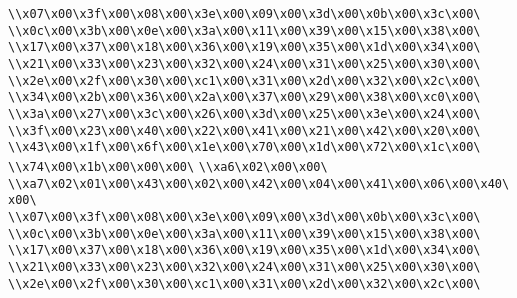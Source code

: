 \verb|\\x07\x00\x3f\x00\x08\x00\x3e\x00\x09\x00\x3d\x00\x0b\x00\x3c\x00\|\newline
\verb|\\x0c\x00\x3b\x00\x0e\x00\x3a\x00\x11\x00\x39\x00\x15\x00\x38\x00\|\newline
\verb|\\x17\x00\x37\x00\x18\x00\x36\x00\x19\x00\x35\x00\x1d\x00\x34\x00\|\newline
\verb|\\x21\x00\x33\x00\x23\x00\x32\x00\x24\x00\x31\x00\x25\x00\x30\x00\|\newline
\verb|\\x2e\x00\x2f\x00\x30\x00\xc1\x00\x31\x00\x2d\x00\x32\x00\x2c\x00\|\newline
\verb|\\x34\x00\x2b\x00\x36\x00\x2a\x00\x37\x00\x29\x00\x38\x00\xc0\x00\|\newline
\verb|\\x3a\x00\x27\x00\x3c\x00\x26\x00\x3d\x00\x25\x00\x3e\x00\x24\x00\|\newline
\verb|\\x3f\x00\x23\x00\x40\x00\x22\x00\x41\x00\x21\x00\x42\x00\x20\x00\|\newline
\verb|\\x43\x00\x1f\x00\x6f\x00\x1e\x00\x70\x00\x1d\x00\x72\x00\x1c\x00\|\newline
\verb|\\x74\x00\x1b\x00\x00\x00\|\newline
\verb|\\xa6\x02\x00\x00\|\newline
\verb|\\xa7\x02\x01\x00\x43\x00\x02\x00\x42\x00\x04\x00\x41\x00\x06\x00\x40\x00\|\newline
\verb|\\x07\x00\x3f\x00\x08\x00\x3e\x00\x09\x00\x3d\x00\x0b\x00\x3c\x00\|\newline
\verb|\\x0c\x00\x3b\x00\x0e\x00\x3a\x00\x11\x00\x39\x00\x15\x00\x38\x00\|\newline
\verb|\\x17\x00\x37\x00\x18\x00\x36\x00\x19\x00\x35\x00\x1d\x00\x34\x00\|\newline
\verb|\\x21\x00\x33\x00\x23\x00\x32\x00\x24\x00\x31\x00\x25\x00\x30\x00\|\newline
\verb|\\x2e\x00\x2f\x00\x30\x00\xc1\x00\x31\x00\x2d\x00\x32\x00\x2c\x00\|\newline
